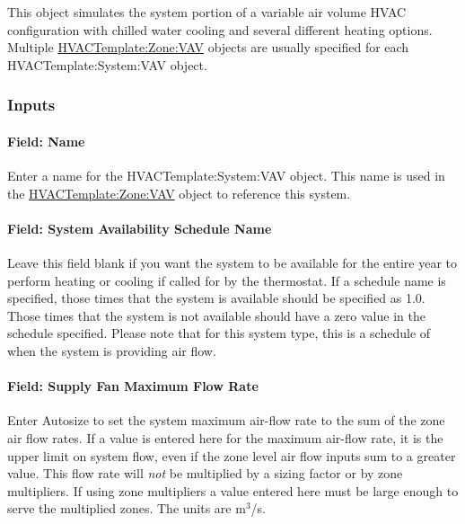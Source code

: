 This object simulates the system portion of a variable air volume HVAC configuration with chilled water cooling and several different heating options. Multiple \hyperref[hvactemplatezonevav]{HVACTemplate:Zone:VAV} objects are usually specified for each HVACTemplate:System:VAV object.

\subsubsection{Inputs}\label{inputs-18-002}

\paragraph{Field: Name}\label{field-name-5-010}

Enter a name for the HVACTemplate:System:VAV object. This name is used in the \hyperref[hvactemplatezonevav]{HVACTemplate:Zone:VAV} object to reference this system.

\paragraph{Field: System Availability Schedule Name}\label{field-system-availability-schedule-name-10}

Leave this field blank if you want the system to be available for the entire year to perform heating or cooling if called for by the thermostat. If a schedule name is specified, those times that the system is available should be specified as 1.0. Those times that the system is not available should have a zero value in the schedule specified. Please note that for this system type, this is a schedule of when the system is providing air flow.

\paragraph{Field: Supply Fan Maximum Flow Rate}\label{field-supply-fan-maximum-flow-rate-1}

Enter Autosize to set the system maximum air-flow rate to the sum of the zone air flow rates. If a value is entered here for the maximum air-flow rate, it is the upper limit on system flow, even if the zone level air flow inputs sum to a greater value. This flow rate will \emph{not} be multiplied by a sizing factor or by zone multipliers. If using zone multipliers a value entered here must be large enough to serve the multiplied zones. The units are m\(^{3}\)/s.

